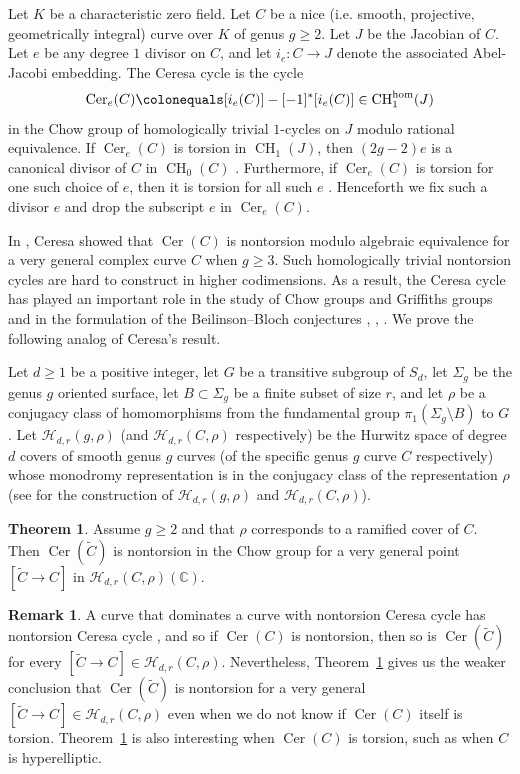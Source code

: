 \documentclass[reqno,10pt]{amsart}
\theoremstyle{definition}
\newtheorem{thm}{Theorem}[section]
\theoremstyle{definition}
\newtheorem*{rems}{Remark}
\def\C{{\mathbb C}}
\def\C{{\mathbb C}}
\newcommand{\CH}{\operatorname{CH}}
\newcommand{\Cer}{\operatorname{Cer}}
\begin{document}
Let $K$ be a characteristic zero field. Let $C$ be a nice (i.e. smooth, projective, geometrically integral) curve over $K$ of genus $g \geq 2$. Let $J$ be the Jacobian of $C$. Let $e$ be any degree $1$ divisor on $C$, and let $i_{e} \colon C \rightarrow J$ denote the associated Abel-Jacobi embedding. The Ceresa cycle is the cycle  \[ \Cer_e(C) \colonequals [i_e(C)] - [-1]^*[i_e(C)] \in \CH_1^{\hom}(J) \]
in the Chow group of homologically trivial $1$-cycles on $J$ modulo rational equivalence. If $\Cer_e(C)$ is torsion in $\CH_1(J)$, then $(2g-2)e$ is a canonical divisor of $C$ in $\CH_0(C)$  \cite[Remark~3]{ELS}. Furthermore, if $\Cer_e(C)$ is torsion for one such choice of $e$, then it is torsion for all such $e$  \cite[Lemma~2.11]{AriJef2}. Henceforth we fix such a divisor $e$ and drop the subscript $e$ in $\Cer_e(C)$. 

In \cite{Ceresa}, Ceresa showed that $\Cer(C)$ is nontorsion modulo algebraic equivalence for a very general complex curve $C$ when $g \geq 3$. Such homologically trivial nontorsion cycles are hard to construct in higher codimensions. As a result, the Ceresa cycle has played an important role in the study of Chow groups and Griffiths groups and in the formulation of the Beilinson--Bloch conjectures \cite{Beilinson}, \cite{Bloch1}, \cite{Bloch2}. We prove the following analog of Ceresa's result. 

Let $d \geq 1$ be a positive integer, let $G$ be a transitive subgroup of $S_d$, let  $\Sigma_g$ be the genus $g$ oriented surface, let $B \subset \Sigma_g$ be a finite subset of size $r$, and let $\rho$ be a conjugacy class of homomorphisms from the fundamental group $ \pi_1(\Sigma_g \setminus B)$ to $G$.  Let $\mathcal{H}_{d,r}(g,\rho)$ (and $\mathcal{H}_{d,r}(C,\rho)$ respectively) be the Hurwitz space of degree $d$ covers of smooth genus $g$ curves (of the specific genus $g$ curve $C$ respectively) whose monodromy representation is in the conjugacy class of the representation $\rho$
(see \cite[Theorem~4]{Wewers} for the construction of $\mathcal{H}_{d,r}(g,\rho)$ and $\mathcal{H}_{d,r}(C,\rho)$).

\begin{thm}\label{thm:Galcoverofggeq2} 
Assume $g \geq 2$ and that $\rho$ corresponds to a ramified cover of $C$. Then $\Cer(\widetilde{C})$ is nontorsion in the Chow group for a very general point $[\widetilde{C} \rightarrow C]$ in $ \mathcal{H}_{d,r}(C,\rho)(\C)$. 
\end{thm}
\begin{rems}
A curve that dominates a curve with nontorsion Ceresa cycle has nontorsion Ceresa cycle \cite[Proposition~25]{CerMod}, and so if $\Cer(C)$ is nontorsion, then so is $\Cer(\widetilde{C})$ for every  $[\widetilde{C} \rightarrow C] \in \mathcal{H}_{d,r}(C,\rho)$. Nevertheless, Theorem~\ref{thm:Galcoverofggeq2} gives us the weaker conclusion that $\Cer(\widetilde{C})$ is nontorsion for a  very general $[\widetilde{C} \rightarrow C] \in \mathcal{H}_{d,r}(C,\rho)$ even when we do not know if $\Cer(C)$ itself is torsion.  Theorem~\ref{thm:Galcoverofggeq2} is also interesting when $\Cer(C)$ is torsion, such as when $C$ is hyperelliptic.
\end{rems}
\end{document}
